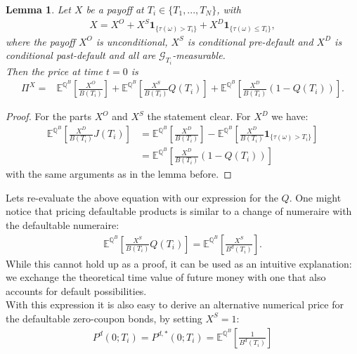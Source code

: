 \documentclass[12pt]{article}
\newtheorem{lemma}[theorem]{Lemma}
\begin{document}
	\begin{lemma}
		Let $X$ be a payoff at $T_i \in \{T_1, ..., T_N\}$, with
		\begin{align*}
			X = X^O + X^S \mathbf{1}_{\{\tau(\omega) > T_i\}} + X^D \mathbf{1}_{\{\tau(\omega) \le T_i\}},
		\end{align*}
		where the payoff $X^O$ is unconditional, $X^S$ is conditional pre-default and $X^D$ is conditional past-default and all are  $\mathcal{G}_{T_i}$-measurable.\\
		Then the price at time $t=0$ is
		\begin{align*}
			\Pi^X =& \mathbb{E}^{\mathbb{Q}^B}\left[ \frac{X^O}{B(T_i)} \right]
			+\mathbb{E}^{\mathbb{Q}^B}\left[ \frac{X^S}{B(T_i)} Q(T_i) \right] + \mathbb{E}^{\mathbb{Q}^B}\left[ \frac{X^D}{B(T_i)} \left(1 - Q(T_i)\right) \right].
		\end{align*}
	\end{lemma}
	\begin{proof}
		For the parts $X^O$ and $X^S$ the statement clear. For $X^D$ we have:
		\begin{align*}
			\mathbb{E}^{\mathbb{Q}^B}\left[ \frac{X^D}{B(T_i)} J(T_i) \right]
			&= \mathbb{E}^{\mathbb{Q}^B}\left[ \frac{X^D}{B(T_i)}\right] - \mathbb{E}^{\mathbb{Q}^B}\left[ \frac{X^D}{B(T_i)} \mathbf{1}_{\{\tau(\omega) > T_i\}} \right]\\
			&=\mathbb{E}^{\mathbb{Q}^B}\left[ \frac{X^D}{B(T_i)} \left(1 - Q(T_i)\right) \right]
		\end{align*}
		with the same arguments as in the lemma before.
	\end{proof}
	Lets re-evaluate the above equation with our expression for the $Q$. One might notice that pricing defaultable products is similar to a change of numeraire with the defaultable numeraire: 
	\begin{align}\label{eq:defaultableclaimvaluation}
		\mathbb{E}^{\mathbb{Q}^B}\left[ \frac{X^S}{B(T_i)} Q(T_i) \right] =
		\mathbb{E}^{\mathbb{Q}^B}\left[ \frac{X^S}{B^d(T_i)} \right].
	\end{align}
	While this cannot hold up as a proof, it can be used as an intuitive explanation: we exchange the theoretical time value of future money with one that also accounts for default possibilities.\\
	With this expression it is also easy to derive an alternative numerical price for the defaultable zero-coupon bonds, by setting $X^S=1$:
	\begin{align*}
		P^d(0;T_i) = P^{d,*}(0;T_i) = \mathbb{E}^{\mathbb{Q}^B}\left[ \frac{1}{B^d(T_i)} \right]
	\end{align*}
\end{document}
